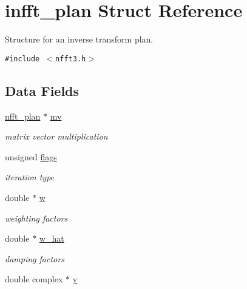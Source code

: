 \hypertarget{structinfft__plan}{
\section{infft\_\-plan Struct Reference}
\label{structinfft__plan}
}
Structure for an inverse transform plan.  


{\tt \#include $<$nfft3.h$>$}

\subsection*{Data Fields}
\begin{CompactItemize}
\item 
\hypertarget{structinfft__plan_o0}{
\hyperlink{structnfft__plan}{nfft\_\-plan} $\ast$ \hyperlink{structinfft__plan_o0}{mv}}
\label{structinfft__plan_o0}

\begin{CompactList}\small\item\em matrix vector multiplication \item\end{CompactList}\item 
\hypertarget{structinfft__plan_o1}{
unsigned \hyperlink{structinfft__plan_o1}{flags}}
\label{structinfft__plan_o1}

\begin{CompactList}\small\item\em iteration type \item\end{CompactList}\item 
\hypertarget{structinfft__plan_o2}{
double $\ast$ \hyperlink{structinfft__plan_o2}{w}}
\label{structinfft__plan_o2}

\begin{CompactList}\small\item\em weighting factors \item\end{CompactList}\item 
\hypertarget{structinfft__plan_o3}{
double $\ast$ \hyperlink{structinfft__plan_o3}{w\_\-hat}}
\label{structinfft__plan_o3}

\begin{CompactList}\small\item\em damping factors \item\end{CompactList}\item 
\hypertarget{structinfft__plan_o4}{
double complex $\ast$ \hyperlink{structinfft__plan_o4}{y}}
\label{structinfft__plan_o4}


\end{CompactItemize}

